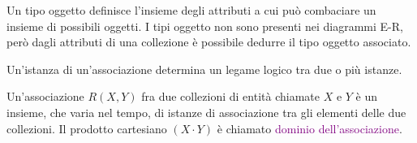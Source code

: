 \begin{definition}
    Un tipo oggetto definisce l'insieme degli attributi a cui può combaciare
    un insieme di possibili oggetti. I tipi oggetto non sono presenti nei diagrammi E-R,
    però dagli attributi di una collezione è possibile dedurre il tipo oggetto associato.
\end{definition}

\begin{definition}
    Un'istanza di un'associazione determina un legame logico tra due o più istanze.
\end{definition}

\begin{definition}[Associazione]
    Un'associazione $R(X, Y)$ fra due collezioni di entità chiamate $X$ e $Y$
    è un insieme, che varia nel tempo, di istanze di associazione tra gli elementi delle due collezioni.
    Il prodotto cartesiano $(X \cdot Y)$ è chiamato \textcolor{purple}{dominio dell'associazione}.
\end{definition}